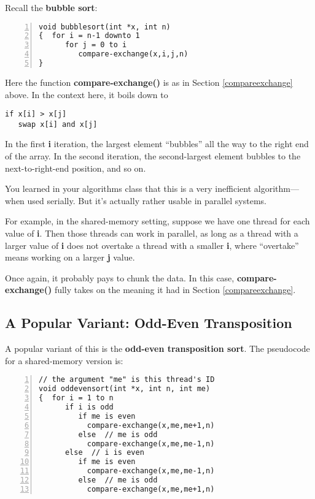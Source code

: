 Recall the {\bf bubble sort}:

\begin{Verbatim}[fontsize=\relsize{-2},numbers=left]
void bubblesort(int *x, int n)
{  for i = n-1 downto 1
      for j = 0 to i
         compare-exchange(x,i,j,n)
}
\end{Verbatim}

Here the function {\bf compare-exchange()} is as in Section
\ref{compareexchange} above.  In the context here, it boils down to

\begin{Verbatim}[fontsize=\relsize{-2}]
if x[i] > x[j]
   swap x[i] and x[j]
\end{Verbatim}

In the first {\bf i} iteration, the largest element ``bubbles'' all the
way to the right end of the array.  In the second iteration, the
second-largest element bubbles to the next-to-right-end position, and so
on.

You learned in your algorithms class that this is a very inefficient
algorithm---when used serially.  But it's actually rather usable in
parallel systems.

For example, in the shared-memory setting, suppose we have one thread
for each value of {\bf i}.  Then those threads can work in parallel, as
long as a thread with a larger value of {\bf i} does not overtake a
thread with a smaller {\bf i}, where ``overtake'' means working on a
larger {\bf j} value.

Once again, it probably pays to chunk the data.  In this case, 
{\bf compare-exchange()} fully takes on the meaning it had in Section
\ref{compareexchange}.

\subsection{A Popular Variant:  Odd-Even Transposition}

A popular variant of this is the {\bf odd-even transposition sort}.  The
pseudocode for a shared-memory version is:

\begin{Verbatim}[fontsize=\relsize{-2},numbers=left]
// the argument "me" is this thread's ID
void oddevensort(int *x, int n, int me)
{  for i = 1 to n 
      if i is odd
         if me is even
           compare-exchange(x,me,me+1,n)
         else  // me is odd
           compare-exchange(x,me,me-1,n)
      else  // i is even
         if me is even
           compare-exchange(x,me,me-1,n)
         else  // me is odd
           compare-exchange(x,me,me+1,n)
\end{Verbatim}

